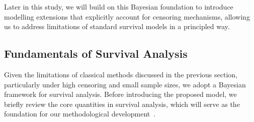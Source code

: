 Later in this study, we will build on this Bayesian foundation to introduce modelling extensions that explicitly account for censoring mechanisms, allowing us to address limitations of standard survival models in a principled way.




\subsection{Fundamentals of Survival Analysis} \label{Fundamentals of Survival Analysis}
Given the limitations of classical methods discussed in the previous section, particularly under high censoring and small sample sizes, we adopt a Bayesian framework for survival analysis. Before introducing the proposed model, we briefly review the core quantities in survival analysis, which will serve as the foundation for our methodological development~\cite{kleinbaum1996survival}.

